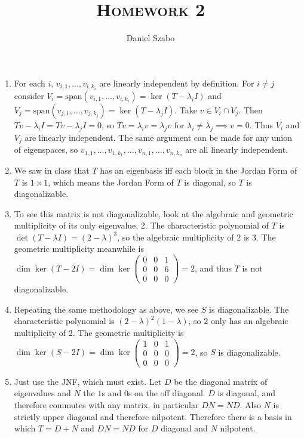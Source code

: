 \documentclass[a4paper]{article}
\title{\textsc{Homework 2}} %
\author{
	Daniel Szabo
}
\date{}
\theoremstyle{definition}
\begin{document}
	
	\maketitle 
	
	\begin{enumerate}
		\item For each $ i $, $ v_{i,1},\ldots, v_{i,k_i} $ are linearly independent by definition. For $ i\neq j $ consider $ V_i=\text{span} (v_{i,1},\ldots, v_{i,k_i}) = \ker(T-\lambda_i I) $ and $ V_j=\text{span}(v_{j,1},\ldots, v_{j,k_j}) = \ker(T-\lambda_j I) $. Take $ v\in V_i\cap V_j $. Then $ Tv-\lambda_i I = Tv - \lambda_j I = 0 $, so $ Tv=\lambda_iv = \lambda_jv $ for $ \lambda_i\neq \lambda_j \implies v=0 $. Thus $ V_i $ and $ V_j $ are linearly independent. The same argument can be made for any union of eigenspaces, so $ v_{1,1},\ldots, v_{1,k_1},\ldots, v_{n,1},\ldots, v_{n,k_n} $ are all linearly independent.
		
		\item We saw in class that $ T $ has an eigenbasis iff each block in the Jordan Form of $ T $ is $ 1\times 1 $, which means the Jordan Form of $ T $ is diagonal, so $ T $ is diagonalizable.
		
		\item To see this matrix is not diagonalizable, look at the algebraic and geometric multiplicity of its only eigenvalue, 2. The characteristic polynomial of $ T $ is $ \det(T-\lambda I) = (2-\lambda)^3 $, so the algebraic multiplicity of $ 2 $ is $ 3 $. The geometric multiplicity meanwhile is $ \dim\ker(T-2I) = \dim\ker\left(\begin{matrix}
			0&0&1\\
			0&0&6\\
			0&0&0
		\end{matrix}\right) = 2 $, and thus $ T $ is not diagonalizable.
	
		\item Repeating the same methodology as above, we see $ S $ is diagonalizable. The characteristic polynomial is $ (2-\lambda)^2(1-\lambda) $, so $ 2 $ only has an algebraic multiplicity of $ 2 $. The geometric multiplicity is $ \dim\ker(S-2I) = \dim\ker\left(\begin{matrix}
			1&0&1\\
			0&0&0\\
			0&0&0
		\end{matrix}\right) = 2 $, so $ S $ is diagonalizable.
	
		\item Just use the JNF, which must exist. Let $ D $ be the diagonal matrix of eigenvalues and $ N $ the $ 1 $s and $ 0 $s on the off diagonal. $ D $ is diagonal, and therefore commutes with any matrix, in particular $ DN=ND $. Also $ N $ is strictly upper diagonal and therefore nilpotent. Therefore there is a basis in which $ T=D+N $ and $ DN=ND $ for $ D $ diagonal and $ N $ nilpotent.
	\end{enumerate}
	
	
	
	
	
	
\end{document}
